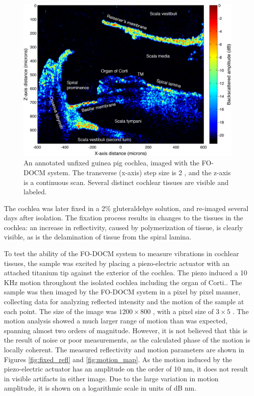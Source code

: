 \begin{figure}[h!]
\centering
\includegraphics[width=1.0\textwidth]{Images/Results/cochlea_ann3.png}
\caption[An annotated unfixed guinea pig cochlea, imaged with the FO-DOCM system.]{An annotated unfixed guinea pig cochlea, imaged with the FO-DOCM system. The transverse (x-axis) step size is 2 \micron, and the z-axis is a continuous scan. Several distinct cochlear tissues are visible and labeled. \label{fig:cochlea_image}}
\end{figure}

The cochlea was later fixed in a 2\% gluteraldehye solution, and re-imaged several days after isolation. The fixation process results in changes to the tissues in the cochlea: an increase in reflectivity, caused by polymerization of tissue, is clearly visible, as is the delamination of tissue from the spiral lamina.

To test the ability of the FO-DOCM system to measure vibrations in cochlear tissues, the sample was excited by placing a piezo-electric actuator with an attached titanium tip against the exterior of the cochlea. The piezo induced a 10 KHz motion throughout the isolated cochlea including the organ of Corti.. The sample was then imaged by the FO-DOCM system in a pixel by pixel manner, collecting data for analyzing reflected intensity and the motion of the sample at each point. The size of the image was $1200\times800$ \micron, with a pixel size of $3\times5$ \micron. The motion analysis showed a much larger range of motion than was expected, spanning almost two orders of magnitude. However, it is not believed that this is the result of noise or poor measurements, as the calculated phase of the motion is  locally coherent. The measured reflectivity and motion parameters are shown in Figures \ref{fig:fixed_refl} and \ref{fig:motion_map}. As the motion induced by the piezo-electric actuator has an amplitude on the order of 10 nm, it does not result in visible artifacts in either image. Due to the large variation in motion amplitude, it is shown on a logarithmic scale in units of dB nm.

